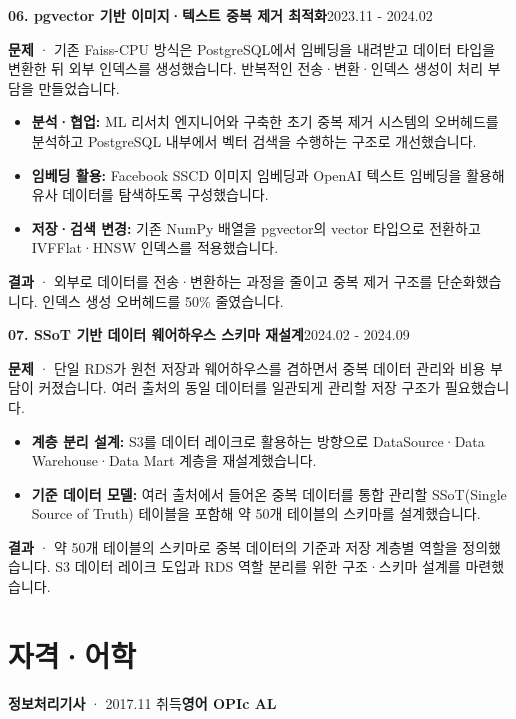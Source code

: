 \documentclass[a4paper,11pt]{article}
\newcommand{\project}[2]{\vspace{5pt}\textbf{\color{accent}#1}\hfill{\small\color{muted}#2}\par}
\begin{document}
\project{06. pgvector 기반 이미지·텍스트 중복 제거 최적화}{2023.11 - 2024.02}
\textbf{문제} · 기존 Faiss-CPU 방식은 PostgreSQL에서 임베딩을 내려받고 데이터 타입을 변환한 뒤 외부 인덱스를 생성했습니다. 반복적인 전송·변환·인덱스 생성이 처리 부담을 만들었습니다.
\begin{itemize}
\item \textbf{분석·협업:} ML 리서치 엔지니어와 구축한 초기 중복 제거 시스템의 오버헤드를 분석하고 PostgreSQL 내부에서 벡터 검색을 수행하는 구조로 개선했습니다.
\item \textbf{임베딩 활용:} Facebook SSCD 이미지 임베딩과 OpenAI 텍스트 임베딩을 활용해 유사 데이터를 탐색하도록 구성했습니다.
\item \textbf{저장·검색 변경:} 기존 NumPy 배열을 pgvector의 vector 타입으로 전환하고 IVFFlat·HNSW 인덱스를 적용했습니다.
\end{itemize}
\textbf{결과} · 외부로 데이터를 전송·변환하는 과정을 줄이고 중복 제거 구조를 단순화했습니다. 인덱스 생성 오버헤드를 50\% 줄였습니다.

\project{07. SSoT 기반 데이터 웨어하우스 스키마 재설계}{2024.02 - 2024.09}
\textbf{문제} · 단일 RDS가 원천 저장과 웨어하우스를 겸하면서 중복 데이터 관리와 비용 부담이 커졌습니다. 여러 출처의 동일 데이터를 일관되게 관리할 저장 구조가 필요했습니다.
\begin{itemize}
\item \textbf{계층 분리 설계:} S3를 데이터 레이크로 활용하는 방향으로 DataSource·Data Warehouse·Data Mart 계층을 재설계했습니다.
\item \textbf{기준 데이터 모델:} 여러 출처에서 들어온 중복 데이터를 통합 관리할 SSoT(Single Source of Truth) 테이블을 포함해 약 50개 테이블의 스키마를 설계했습니다.
\end{itemize}
\textbf{결과} · 약 50개 테이블의 스키마로 중복 데이터의 기준과 저장 계층별 역할을 정의했습니다. S3 데이터 레이크 도입과 RDS 역할 분리를 위한 구조·스키마 설계를 마련했습니다.


\section{자격·어학}
\textbf{정보처리기사} · 2017.11 취득\hfill\textbf{영어 OPIc AL}
\end{document}
